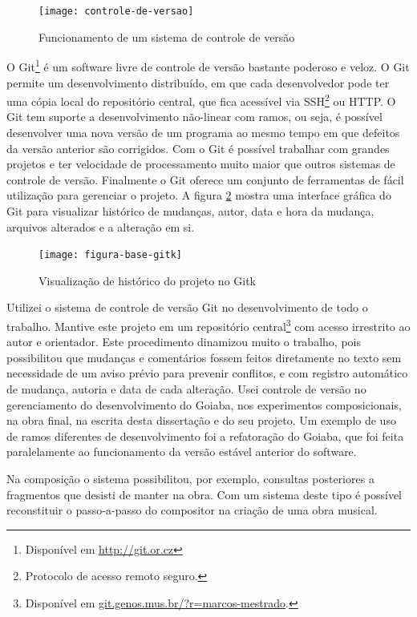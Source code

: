 \begin{figure}
  \centering
  \texttt{[image: controle-de-versao]}
  \caption{Funcionamento de um sistema de controle de versão}
  \label{fig:controle-de-versao}
\end{figure}

O Git\footnote{Disponível em \url{http://git.or.cz}} é um software
livre de controle de versão bastante poderoso e veloz. O Git permite
um desenvolvimento distribuído, em que cada desenvolvedor pode ter uma
cópia local do repositório central, que fica acessível via
SSH\footnote{Protocolo de acesso remoto seguro.} ou HTTP. O Git tem
suporte a desenvolvimento não-linear com ramos, ou seja, é possível
desenvolver uma nova versão de um programa ao mesmo tempo em que
defeitos da versão anterior são corrigidos. Com o Git é possível
trabalhar com grandes projetos e ter velocidade de processamento muito
maior que outros sistemas de controle de versão. Finalmente o Git
oferece um conjunto de ferramentas de fácil utilização para gerenciar
o projeto. A figura \ref{fig:historico-git} mostra uma interface
gráfica do Git para visualizar histórico de mudanças, autor, data e
hora da mudança, arquivos alterados e a alteração em si.

\begin{figure}
  \centering
  \texttt{[image: figura-base-gitk]}
  \caption{Visualização de histórico do projeto no Gitk}
  \label{fig:historico-git}
\end{figure}

Utilizei o sistema de controle de versão Git no desenvolvimento de
todo o trabalho. Mantive este projeto em um repositório
central\footnote{Disponível em
  \url{git.genos.mus.br/?r=marcos-mestrado}.} com acesso irrestrito ao
autor e orientador. Este procedimento dinamizou muito o trabalho, pois
possibilitou que mudanças e comentários fossem feitos diretamente no
texto sem necessidade de um aviso prévio para prevenir conflitos, e
com registro automático de mudança, autoria e data de cada
alteração. Usei controle de versão no gerenciamento do desenvolvimento
do Goiaba, nos experimentos composicionais, na obra final, na escrita
desta dissertação e do seu projeto. Um exemplo de uso de ramos
diferentes de desenvolvimento foi a refatoração do Goiaba, que foi
feita paralelamente ao funcionamento da versão estável anterior do
software.

Na composição o sistema possibilitou, por exemplo, consultas
posteriores a fragmentos que desisti de manter na obra. Com um sistema
deste tipo é possível reconstituir o passo-a-passo do compositor na
criação de uma obra musical.

